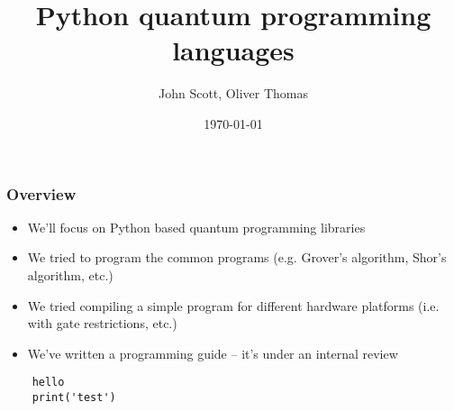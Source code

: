 \documentclass{beamer}
\title{Python quantum programming languages}
\author{John Scott, Oliver Thomas}
\institute{Quantum Engineering CDT \\ University of Bristol}
\date{\today}
\begin{document}
\frame{\titlepage}

\begin{frame}
\frametitle{Overview}
\begin{itemize}
    \item We'll focus on Python based quantum programming libraries
    \item We tried to program the common programs (e.g. Grover's algorithm, Shor's algorithm, etc.)
    \item We tried compiling a simple program for different hardware platforms (i.e. with gate restrictions, etc.)
    \item We've written a programming guide -- it's under an internal review
\end{itemize}
\end{frame}

\begin{frame}[fragile]
  \begin{verbatim}
    hello
    print('test')
  \end{verbatim}
\end{frame}
\end{document}

